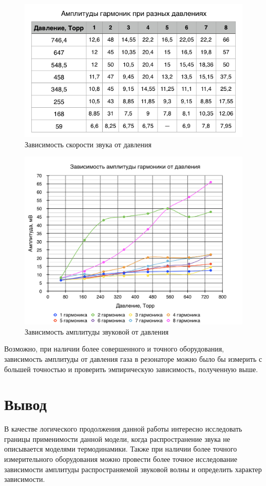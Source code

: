 \documentclass[a4paper,12pt]{article}
\begin{document}
\begin{figure}[h]
    \centering
    \includegraphics[width=\textwidth]{t_A(p).png}
    \caption{Зависимость скорости звука от давления}
    \label{gr:final}
\end{figure}

\begin{figure}[h]
    \centering
    \includegraphics[width=\textwidth]{gr_A(p).png}
    \caption{Зависимость амплитуды звуковой от давления}
    \label{gr:final}
\end{figure}
Возможно, при наличии более совершенного и точного оборудования, зависимость амплитуды от давления газа в резонаторе можно было бы измерить с большей точностью и проверить эмпирическую зависимость, полученную выше.

\clearpage

\section{Вывод}
В качестве логического продолжения данной работы интересно исследовать границы применимости данной модели, когда распространение звука не описывается моделями термодинамики. Также при наличии более точного измерительного оборудования можно провести более точное исследование зависимости амплитуды распространяемой звуковой волны и определить характер зависимости.
\end{document}
